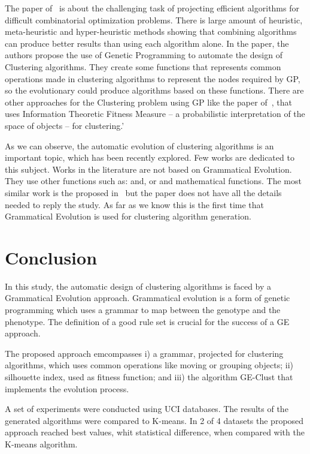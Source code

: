 \documentclass[conference,compsoc]{IEEEtran}
\begin{document}
The paper of~\cite{bolton2015optimizing} is about the challenging task of projecting efficient algorithms for difficult combinatorial optimization problems. There is large amount of heuristic, meta-heuristic and hyper-heuristic methods showing that combining algorithms can produce better results than using each algorithm alone. In the paper, the authors propose the use of Genetic Programming to automate the design of Clustering algorithms. They create some functions that represents common operations made in clustering algorithms to represent the nodes required by GP, so the evolutionary could produce algorithms based on these functions. There are other approaches for the Clustering problem using GP like the paper of~\cite{boric2007genetic}, that uses Information Theoretic Fitness Measure -- a probabilistic interpretation of the space of objects -- for clustering.'

As we can observe, the automatic evolution of clustering algorithms is an important topic, which has been recently explored. Few works are dedicated to this subject.   Works in the literature are not based on Grammatical Evolution. They use other functions such as:  and, or and mathematical functions. The most similar work is the proposed in~\cite{bolton2015optimizing} but the paper does not have all the details needed to reply the study.  As far as we know this is the first time that Grammatical Evolution is used for clustering algorithm generation. 


\section{Conclusion}
\label{sec:conclusion}


In this study, the automatic design of clustering algorithms is faced by a Grammatical Evolution approach. Grammatical evolution is a form of genetic programming which uses a grammar to map between the genotype and the phenotype. The definition of a good rule set is crucial for the success of a GE approach. 

The proposed approach emcompasses i) a grammar,  projected for clustering algorithms, which uses common operations like moving or grouping objects; ii)  silhouette index, used as fitness function; and iii) the algorithm GE-Clust that implements the evolution process. 

A set of experiments were conducted using UCI databases. The results of the generated algorithms were compared to K-means. In 2 of 4 datasets the proposed approach reached best values, whit statistical difference, when compared with the K-means algorithm.
\end{document}
